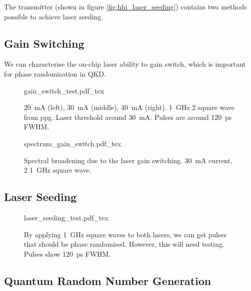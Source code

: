 The transmitter (shown in figure \ref{fig:hhi_laser_seeding}) contains two methods possible to achieve laser seeding.

\subsection{Gain Switching}

We can characterise the on-chip laser ability to gain switch, which is important for phase randomisation in \ac{QKD}. 

\begin{figure}[tp]
	\centering
	\small	
	\def\svgwidth{\textwidth} 
	{gain_switch_test.pdf_tex}
	\caption[Gain switching test of the HHI on-chip lasers]{\SI{20}{mA} (left), \SI{30}{\mA} (middle), \SI{40}{\mA} (right). \SI{1}{GHz} \SI{2}{\Vpp} square wave from \ac{ppg}. Laser threshold around \SI{30}{mA}. Pulses are around \SI{120}{ps} \ac{FWHM}.}
	\label{fig:gain_switch_test}
\end{figure}

\begin{figure}[tp]
	\centering
	\small	
	\def\svgwidth{0.9\textwidth} 
	{spectrum_gain_switch.pdf_tex}
	\caption[Spectrum of the gain switched laser]{Spectral broadening due to the laser gain switching. \SI{30}{mA} current, \SI{2}{\Vpp} \SI{1}{\GHz} square wave.}
	\label{fig:gain_switch_spectrum}
\end{figure}

\subsection{Laser Seeding}



\begin{figure}[tp]
	\centering	
	\def\svgwidth{0.9\textwidth} 
	{laser_seeding_test.pdf_tex}
	\caption[Integrated laser seeding test]{By applying \SI{1}{GHz} square waves to both lasers, we can get pulses that should be phase randomised. However,  this will need testing. Pulses show \SI{120}{ps} \ac{FWHM}.}
	\label{fig:las_seed_test}
\end{figure}

\subsection{Quantum Random Number Generation}

